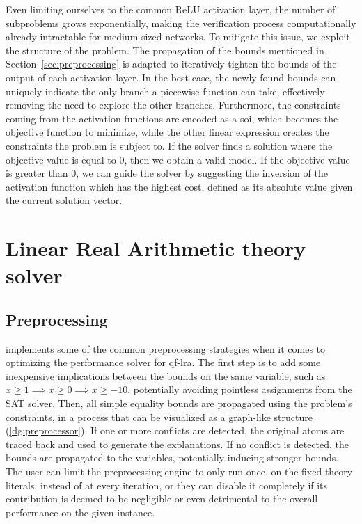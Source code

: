 \documentclass[runningheads]{llncs}
\begin{document}
Even limiting ourselves to the common ReLU activation layer, the number of subproblems grows exponentially, making the verification process computationally already intractable for medium-sized networks.
To mitigate this issue, we exploit the structure of the problem.
The propagation of the bounds mentioned in Section~\ref{sec:preprocessing} is adapted to iteratively tighten the bounds of the output of each activation layer.
In the best case, the newly found bounds can uniquely indicate the only branch a piecewise function can take, effectively removing the need to explore the other branches.
Furthermore, the constraints coming from the activation functions are encoded as a \gls{soi}, which becomes the objective function to minimize, while the other linear expression creates the constraints the problem is subject to.
If the solver finds a solution where the objective value is equal to $0$, then we obtain a valid model.
If the objective value is greater than $0$, we can guide the solver by suggesting the inversion of the activation function which has the highest cost, defined as its absolute value given the current solution vector.

\section{Linear Real Arithmetic theory solver}
\label{sec:lra-theory-solver}

\subsection*{Preprocessing}
\label{sec:preprocessing}

\dlinear implements some of the common preprocessing strategies when it comes to optimizing the performance solver for \gls{qf-lra}.
The first step is to add some inexpensive implications between the bounds on the same variable, such as $x \ge 1 \implies x \ge 0 \implies x \ge -10$, potentially avoiding pointless assignments from the SAT solver.
Then, all simple equality bounds are propagated using the problem's constraints, in a process that can be visualized as a graph-like structure (\autoref{dg:preprocessor}).
If one or more conflicts are detected, the original atoms are traced back and used to generate the explanations.
If no conflict is detected, the bounds are propagated to the variables, potentially inducing stronger bounds.
The user can limit the preprocessing engine to only run once, on the fixed theory literals, instead of at every iteration, or they can disable it completely if its contribution is deemed to be negligible or even detrimental to the overall performance on the given instance.
\end{document}
